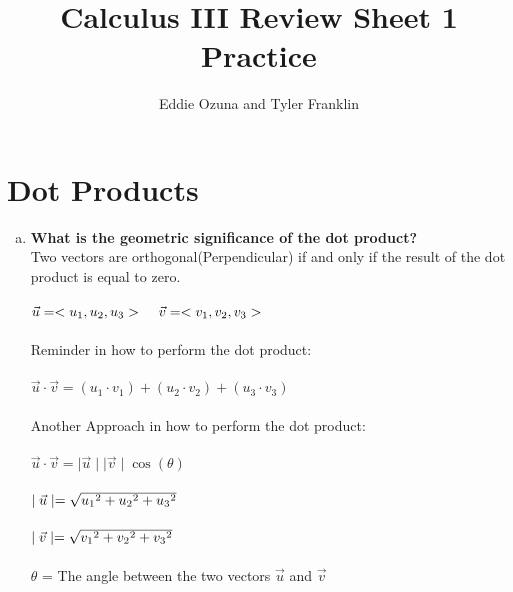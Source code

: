 \documentclass{article}
\title{Calculus III Review Sheet 1 Practice}
\author{Eddie Ozuna and Tyler Franklin}
\begin{document}
\maketitle
\section{Dot Products}
\begin{enumerate}[a.]
	\item \textbf{What is the geometric significance of the dot product? }
	      \\
	      Two vectors are orthogonal(Perpendicular) if and only if the result of the dot product is equal to zero.\\\\
	      $\vec{u} = <u_{1},u_{2},u_{3}>\hspace{.4cm}\vec{v} = <v_{1},v_{2},v_{3}>$\\
	      \\
	      Reminder in how to perform the dot product:\\
	      \\
	      $\vec{u} \cdot \vec{v} = (u_{1} \cdot v_{1}) + (u_{2} \cdot v_{2}) + (u_{3} \cdot v_{3}) $\\
	      \\
	      Another Approach in how to perform the dot product:\\
	      \\
	      $\vec{u} \cdot \vec{v} =  \mid\vec{u}\mid\mid\vec{v}\mid\cos(\theta)$\\
	      \\
	      $\mid\vec{u}\mid = \sqrt{u_{1}\hspace{.001cm}^{2}+u_{2}\hspace{.001cm}^{2}+u_{3}\hspace{.001cm}^{2}}$\\
	      \\
	      $\mid\vec{v}\mid = \sqrt{v_{1}\hspace{.001cm}^{2}+v_{2}\hspace{.001cm}^{2}+v_{3}\hspace{.001cm}^{2}}$\\
	      \\
	      $\theta$ = The angle between the two vectors $\vec{u}$ and $\vec{v}$
\end{enumerate}
\end{document}
